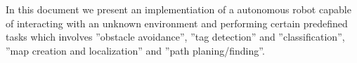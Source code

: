 In this document we present an implementiation of a autonomous robot capable of interacting with an unknown environment and performing certain predefined tasks which involves ''obstacle avoidance'', ''tag detection'' and ''classification'', ''map creation and localization'' and ''path planing/finding''.